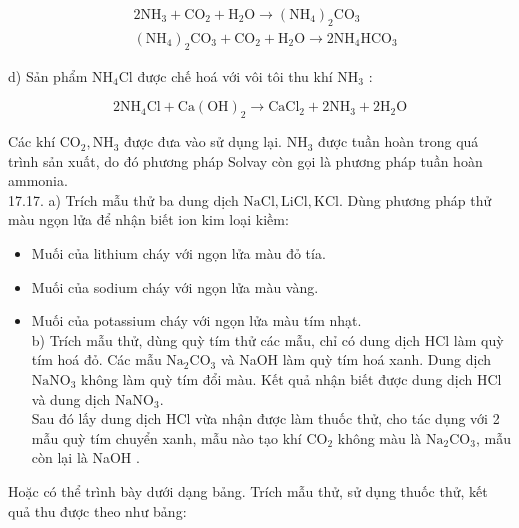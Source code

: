 \documentclass[10pt]{article}
\begin{document}
$$
\begin{aligned}
& 2 \mathrm{NH}_{3}+\mathrm{CO}_{2}+\mathrm{H}_{2} \mathrm{O} \rightarrow\left(\mathrm{NH}_{4}\right)_{2} \mathrm{CO}_{3} \\
& \left(\mathrm{NH}_{4}\right)_{2} \mathrm{CO}_{3}+\mathrm{CO}_{2}+\mathrm{H}_{2} \mathrm{O} \rightarrow 2 \mathrm{NH}_{4} \mathrm{HCO}_{3}
\end{aligned}
$$

d) Sản phẩm $\mathrm{NH}_{4} \mathrm{Cl}$ được chế hoá với vôi tôi thu khí $\mathrm{NH}_{3}$ :

$$
2 \mathrm{NH}_{4} \mathrm{Cl}+\mathrm{Ca}(\mathrm{OH})_{2} \rightarrow \mathrm{CaCl}_{2}+2 \mathrm{NH}_{3}+2 \mathrm{H}_{2} \mathrm{O}
$$

Các khí $\mathrm{CO}_{2}, \mathrm{NH}_{3}$ được đưa vào sử dụng lại. $\mathrm{NH}_{3}$ được tuần hoàn trong quá trình sản xuất, do đó phương pháp Solvay còn gọi là phương pháp tuần hoàn ammonia.\\
17.17. a) Trích mẫu thử ba dung dịch $\mathrm{NaCl}, \mathrm{LiCl}, \mathrm{KCl}$. Dùng phương pháp thử màu ngọn lửa để nhận biết ion kim loại kiềm:

\begin{itemize}
  \item Muối của lithium cháy với ngọn lửa màu đỏ tía.
  \item Muối của sodium cháy với ngọn lửa màu vàng.
  \item Muối của potassium cháy với ngọn lửa màu tím nhạt.\\
b) Trích mẫu thử, dùng quỳ tím thử các mẫu, chỉ có dung dịch HCl làm quỳ tím hoá đỏ. Các mẫu $\mathrm{Na}_{2} \mathrm{CO}_{3}$ và NaOH làm quỳ tím hoá xanh. Dung dịch $\mathrm{NaNO}_{3}$ không làm quỳ tím đổi màu. Kết quả nhận biết được dung dịch HCl và dung dịch $\mathrm{NaNO}_{3}$.\\
Sau đó lấy dung dịch HCl vừa nhận được làm thuốc thử, cho tác dụng với 2 mẫu quỳ tím chuyển xanh, mẫu nào tạo khí $\mathrm{CO}_{2}$ không màu là $\mathrm{Na}_{2} \mathrm{CO}_{3}$, mẫu còn lại là NaOH .
\end{itemize}

Hoặc có thể trình bày dưới dạng bảng. Trích mẫu thử, sử dụng thuốc thử, kết quả thu được theo như bảng:
\end{document}
